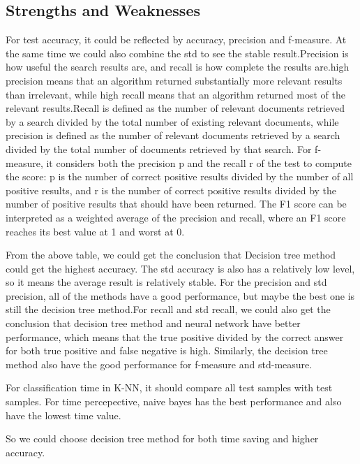 \documentclass[]{article}
\begin{document}
\subsection{Strengths and Weaknesses}
For test accuracy, it could be reflected by accuracy, precision and f-measure. At the same time we could also combine the std to see the stable result.Precision is how useful the search results are, and recall is how complete the results are.high precision means that an algorithm returned substantially more relevant results than irrelevant, while high recall means that an algorithm returned most of the relevant results.Recall is defined as the number of relevant documents retrieved by a search divided by the total number of existing relevant documents, while precision is defined as the number of relevant documents retrieved by a search divided by the total number of documents retrieved by that search. For f-measure, it considers both the precision p and the recall r of the test to compute the score: p is the number of correct positive results divided by the number of all positive results, and r is the number of correct positive results divided by the number of positive results that should have been returned. The F1 score can be interpreted as a weighted average of the precision and recall, where an F1 score reaches its best value at 1 and worst at 0.


From the above table, we could get the conclusion that Decision tree method could get the highest accuracy. The std accuracy is also has a relatively low level, so it means the average result is relatively stable. For the precision and std precision, all of the methods have a good performance, but maybe the best one is still the decision tree method.For recall and std recall, we could also get the conclusion that decision tree method and neural network have better performance, which means that the true positive divided by the correct answer for both true positive and false negative is high. Similarly, the decision tree method also have the good performance for f-measure and std-measure.

For classification time in K-NN, it should compare all test samples with test samples. For time percepective, naive bayes has the best performance and also have the lowest time value. 

So we could choose decision tree method for both time saving and higher accuracy. 

\end{document}
